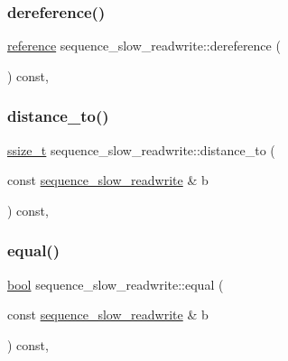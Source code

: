 \subsubsection{\texorpdfstring{dereference()}{dereference()}}
{\footnotesize\ttfamily \mbox{\hyperlink{classsequence__slow__readwrite_ad59d36dc33d3bcff00de01c2d21ffe42}{reference}} sequence\+\_\+slow\+\_\+readwrite\+::dereference (\begin{DoxyParamCaption}{ }\end{DoxyParamCaption}) const\hspace{0.3cm}{\ttfamily [inline]}, {\ttfamily [protected]}}

\mbox{\label{classsequence__slow__readwrite_a971f935ea0b4db43994eb1adc4327ec4}} 
\subsubsection{\texorpdfstring{distance\_to()}{distance\_to()}}
{\footnotesize\ttfamily \mbox{\hyperlink{detail_2common_8h_ac430d16fc097b3bf0a7469cfd09decda}{ssize\+\_\+t}} sequence\+\_\+slow\+\_\+readwrite\+::distance\+\_\+to (\begin{DoxyParamCaption}\item[{const \mbox{\hyperlink{classsequence__slow__readwrite}{sequence\+\_\+slow\+\_\+readwrite}} \&}]{b }\end{DoxyParamCaption}) const\hspace{0.3cm}{\ttfamily [inline]}, {\ttfamily [protected]}}

\mbox{\label{classsequence__slow__readwrite_a7efc0f4d3cc74714cc043ef1d65c3ab7}} 
\subsubsection{\texorpdfstring{equal()}{equal()}}
{\footnotesize\ttfamily \mbox{\hyperlink{asdl_8h_af6a258d8f3ee5206d682d799316314b1}{bool}} sequence\+\_\+slow\+\_\+readwrite\+::equal (\begin{DoxyParamCaption}\item[{const \mbox{\hyperlink{classsequence__slow__readwrite}{sequence\+\_\+slow\+\_\+readwrite}} \&}]{b }\end{DoxyParamCaption}) const\hspace{0.3cm}{\ttfamily [inline]}, {\ttfamily [protected]}}

